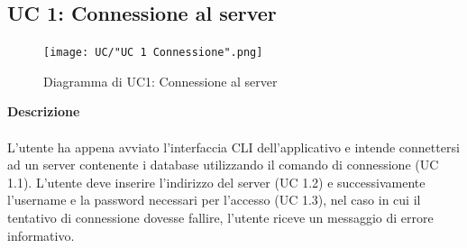 \documentclass[a4paper]{article}
\begin{document}
	 
	 
	 \subsection{UC 1: Connessione al server}
	 \begin{figure}[H]
				\centering
				\texttt{[image: UC/"UC 1 Connessione".png]}
				\caption{Diagramma di UC1: Connessione al server}
			\end{figure}
	\textbf{Descrizione} 
	\\ \\
	L'utente ha appena avviato l'interfaccia CLI dell'applicativo e intende connettersi ad un server contenente i database utilizzando il comando di connessione (UC 1.1). L'utente deve inserire l'indirizzo del server (UC 1.2) e successivamente l'username e la password necessari per l'accesso (UC 1.3), nel caso in cui il tentativo di connessione dovesse fallire, l'utente riceve un messaggio di errore informativo.
\end{document}
